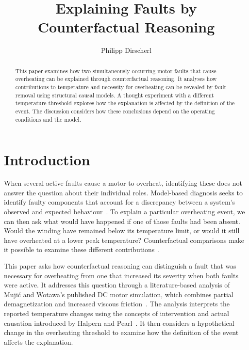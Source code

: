 \documentclass[runningheads]{llncs}
\begin{document}
\title{Explaining Faults by Counterfactual Reasoning}
\author{Philipp Dirscherl}

\maketitle

\begin{abstract}
This paper examines how two simultaneously occurring motor faults that cause overheating can be explained 
through counterfactual reasoning. It analyses how contributions to temperature and necessity for overheating 
can be revealed by fault removal using structural causal models. 
A thought experiment with a different temperature threshold explores how the explanation is affected by the definition of the event. 
The discussion considers how these conclusions depend on the operating conditions and the model.
\end{abstract}

\section{Introduction}
When several active faults cause a motor to overheat, 
identifying these does not answer the question about their individual roles.
Model-based diagnosis seeks to identify faulty components that account
for a discrepancy between a system's observed and expected
behaviour~\cite[p.~57]{reiter1987}.
To explain a particular overheating event, we can then ask what would
have happened if one of those faults had been absent.
Would the winding have remained below its temperature limit, or would
it still have overheated at a lower peak temperature?
Counterfactual comparisons make it possible to examine these different
contributions~\cite[Sect.~3.3]{mujic2026}.

This paper asks how counterfactual reasoning can distinguish a fault
that was necessary for overheating from one that increased its severity
when both faults were active. It addresses this question through a
literature-based analysis of Muji\'{c} and Wotawa's published DC motor
simulation, which combines partial demagnetization and increased
viscous friction~\cite[Sect.~4.2]{mujic2026}.
The analysis interprets the reported temperature changes using the
concepts of intervention and actual causation introduced by Halpern
and Pearl~\cite[Sects.~2--3]{halpern2005}.
It then considers a hypothetical change in the overheating threshold
to examine how the definition of the event affects the explanation.
\end{document}
